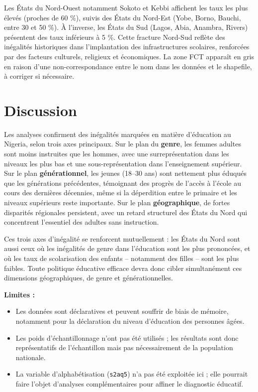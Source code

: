 \documentclass[
  11pt,
]{article}
\begin{document}
Les États du Nord-Ouest notamment Sokoto et Kebbi affichent les taux les
plus élevés (proches de 60 \%), suivis des États du Nord-Est (Yobe,
Borno, Bauchi, entre 30 et 50 \%). À l'inverse, les États du Sud (Lagos,
Abia, Anambra, Rivers) présentent des taux inférieurs à 5 \%. Cette
fracture Nord-Sud reflète des inégalités historiques dans l'implantation
des infrastructures scolaires, renforcées par des facteurs culturels,
religieux et économiques. La zone FCT apparaît en gris en raison d'une
non-correspondance entre le nom dans les données et le shapefile, à
corriger si nécessaire.

\section{Discussion}\label{discussion}

Les analyses confirment des inégalités marquées en matière d'éducation
au Nigeria, selon trois axes principaux. Sur le plan du \textbf{genre},
les femmes adultes sont moins instruites que les hommes, avec une
surreprésentation dans les niveaux les plus bas et une
sous-représentation dans l'enseignement supérieur. Sur le plan
\textbf{générationnel}, les jeunes (18--30 ans) sont nettement plus
éduqués que les générations précédentes, témoignant des progrès de
l'accès à l'école au cours des dernières décennies, même si la
déperdition entre le primaire et les niveaux supérieurs reste
importante. Sur le plan \textbf{géographique}, de fortes disparités
régionales persistent, avec un retard structurel des États du Nord qui
concentrent l'essentiel des adultes sans instruction.

Ces trois axes d'inégalité se renforcent mutuellement : les États du
Nord sont aussi ceux où les inégalités de genre dans l'éducation sont
les plus prononcées, et où les taux de scolarisation des enfants --
notamment des filles -- sont les plus faibles. Toute politique éducative
efficace devra donc cibler simultanément ces dimensions géographiques,
de genre et générationnelles.

\textbf{Limites :}

\begin{itemize}
\item
  Les données sont déclaratives et peuvent souffrir de biais de mémoire,
  notamment pour la déclaration du niveau d'éducation des personnes
  âgées.
\item
  Les poids d'échantillonnage n'ont pas été utilisés ; les résultats
  sont donc représentatifs de l'échantillon mais pas nécessairement de
  la population nationale.
\item
  La variable d'alphabétisation (\texttt{s2aq5}) n'a pas été exploitée
  ici ; elle pourrait faire l'objet d'analyses complémentaires pour
  affiner le diagnostic éducatif.
\end{itemize}
\end{document}
